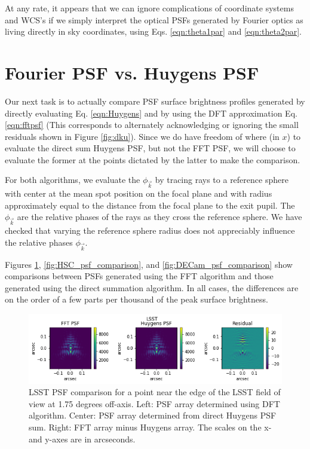 \documentclass{article}
\begin{document}
At any rate, it appears that we can ignore complications of coordinate systems and WCS's if we
simply interpret the optical PSFs generated by Fourier optics as living directly in sky coordinates,
using Eqs. \ref{eqn:theta1par} and \ref{eqn:theta2par}.

\section{Fourier PSF vs. Huygens PSF}

Our next task is to actually compare PSF surface brightness profiles generated by directly
evaluating Eq. \ref{eqn:Huygens} and by using the DFT approximation Eq. \ref{eqn:fftpsf}  (This
corresponds to alternately acknowledging or ignoring the small residuals shown in Figure
\ref{fig:dku}).  Since we do have freedom of where (in $x$) to evaluate the direct sum Huygens PSF,
but not the FFT PSF, we will choose to evaluate the former at the points dictated by the latter to
make the comparison.

For both algorithms, we evaluate the $\phi_{\vec{k}}$ by tracing rays to a reference sphere with
center at the mean spot position on the focal plane and with radius approximately equal to the
distance from the focal plane to the exit pupil.  The $\phi_{\vec{k}}$ are the relative phases of
the rays as they cross the reference sphere.  We have checked that varying the reference sphere
radius does not appreciably influence the relative phases $\phi_{\vec{k}}$.

Figures \ref{fig:LSST_psf_comparison}, \ref{fig:HSC_psf_comparison}, and
\ref{fig:DECam_psf_comparison} show comparisons between PSFs generated using the FFT algorithm and
those generated using the direct summation algorithm.  In all cases, the differences are on the
order of a few parts per thousand of the peak surface brightness.

\begin{figure}
    \includegraphics[scale=0.7]{LSST_PSF_comparison.png}

    \caption{LSST PSF comparison for a point near the edge of the LSST field of view at 1.75 degrees
    off-axis.  Left: PSF array determined using DFT algorithm.  Center: PSF array determined from
    direct Huygens PSF sum.  Right: FFT array minus Huygens array.  The scales on the x- and y-axes
    are in arcseconds. }

    \label{fig:LSST_psf_comparison}
\end{figure}
\end{document}
